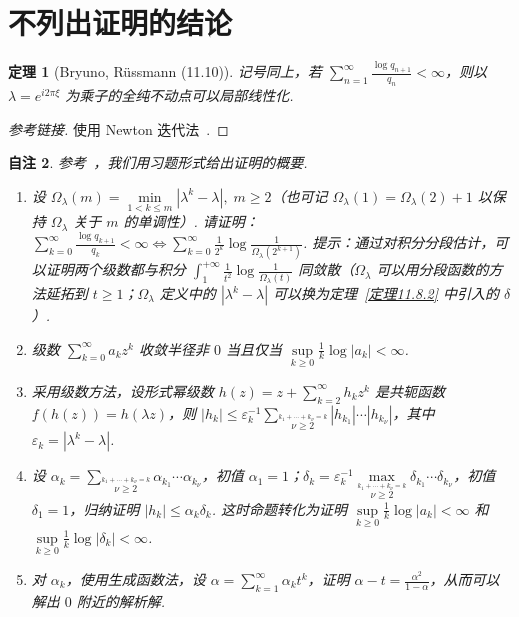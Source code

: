 \documentclass[11pt, a4paper, oneside]{ctexart}
\newtheorem{theorem}{定理}[section]
\newtheorem{note}[theorem]{自注}
\newcommand{\abs}[1]{\left|{#1}\right|}
\begin{document}
    \section{不列出证明的结论}
    \begin{theorem}[Bryuno, Rüssmann (11.10)]\label{定理11.10}
        记号同上，若 $\sum\limits_{n=1}^{\infty}\frac{\log q_{n+1}}{q_n}<\infty$，则以 $\lambda=e^{i 2\pi \xi}$ 为乘子的全纯不动点可以局部线性化.
    \end{theorem}
    \begin{proof}[参考链接]
        使用 Newton 迭代法~\cite{russmann}.
    \end{proof}
    \begin{note}
        参考~\cite{abate}，我们用习题形式给出证明的概要.
        \begin{enumerate}[(1)]
            \item 设 $\Omega_{\lambda}(m)=\min\limits_{1<k\leq m}\abs{\lambda^k-\lambda},\; m\geq 2$（也可记 $\Omega_{\lambda}(1)=\Omega_{\lambda}(2)+1$ 以保持 $\Omega_{\lambda}$ 关于 $m$ 的单调性）. 请证明：$\sum\limits_{k=0}^{\infty}\frac{\log q_{k+1}}{q_k}<\infty\Leftrightarrow \sum\limits_{k=0}^{\infty}\frac{1}{2^k}\log\frac{1}{\Omega_{\lambda}(2^{k+1})}$. 提示：通过对积分分段估计，可以证明两个级数都与积分 $\int_{1}^{+\infty}\frac{1}{t^2}\log\frac{1}{\Omega_{\lambda}(t)}$ 同敛散（$\Omega_{\lambda}$ 可以用分段函数的方法延拓到 $t\geq 1$；$\Omega_{\lambda}$ 定义中的 $\abs{\lambda^k-\lambda}$ 可以换为定理~\ref{定理11.8.2} 中引入的 $\delta$）.
            \item 级数 $\sum\limits_{k=0}^{\infty}a_k z^k$ 收敛半径非 $0$ 当且仅当 $\sup\limits_{k\geq 0}\frac{1}{k}\log\abs{a_k}<\infty$.
            \item 采用级数方法，设形式幂级数 $h(z)=z+\sum\limits_{k=2}^{\infty}h_k z^k$ 是共轭函数 $f(h(z))=h(\lambda z)$，则 $\abs{h_k}\leq \varepsilon_k^{-1}\sum\limits_{\stackrel{k_1+\cdots+k_{\nu}=k}{\nu\geq 2}}\abs{h_{k_1}}\cdots\abs{h_{k_{\nu}}}$，其中 $\varepsilon_k=\abs{\lambda^k-\lambda}$.
            \item 设 $\alpha_k=\sum\limits_{\stackrel{k_1+\cdots+k_{\nu}=k}{\nu\geq 2}}\alpha_{k_1}\cdots\alpha_{k_{\nu}}$，初值 $\alpha_1=1$；$\delta_k=\varepsilon_k^{-1}\max\limits_{\stackrel{k_1+\cdots+k_{\nu}=k}{\nu\geq 2}}\delta_{k_1}\cdots \delta_{k_{\nu}}$，初值 $\delta_1=1$，归纳证明 $\abs{h_k}\leq \alpha_k\delta_k$. 这时命题转化为证明 $\sup\limits_{k\geq 0}\frac{1}{k}\log\abs{a_k}<\infty$ 和 $\sup\limits_{k\geq 0}\frac{1}{k}\log\abs{\delta_k}<\infty$.
            \item 对 $\alpha_k$，使用生成函数法，设 $\alpha=\sum\limits_{k=1}^{\infty}\alpha_k t^k$，证明 $\alpha-t=\frac{\alpha^2}{1-\alpha}$，从而可以解出 $0$ 附近的解析解.

\end{enumerate}
\end{note}
\end{document}
